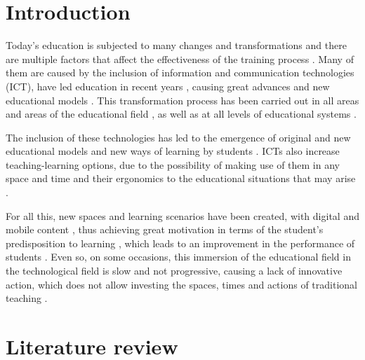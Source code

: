 \documentclass[english]{textolivre}
\begin{document}
\begin{polyabstract}
\begin{portuguese}
\begin{abstract}
\end{abstract}
\end{portuguese}

\end{polyabstract}


\section{Introduction}\label{sec-intro}
Today's education is subjected to many changes and transformations and there are multiple factors that affect the effectiveness of the training process \cite{murillo2016}. Many of them are caused by the inclusion of information and communication technologies (ICT), have led education in recent years \cite{rodriguez2018}, causing great advances and new educational models \cite{vinals2016}. This transformation process has been carried out in all areas and areas of the educational field \cite{area2016, pereira2019}, as well as at all levels of educational systems \cite{larionova2018}.

The inclusion of these technologies has led to the emergence of original and new educational models \cite{li2019} and new ways of learning by students \cite{garrote2018}. ICTs also increase teaching-learning options, due to the possibility of making use of them in any space and time and their ergonomics to the educational situations that may arise \cite{fombonapascual2017}.

For all this, new spaces and learning scenarios have been created, with digital and mobile content \cite{radu2014}, thus achieving great motivation in terms of the student's predisposition to learning \cite{villalustredelmoral2017}, which leads to an improvement in the performance of students \cite{marinmunoz2018}. Even so, on some occasions, this immersion of the educational field in the technological field is slow and not progressive, causing a lack of innovative action, which does not allow investing the spaces, times and actions of traditional teaching \cite{llanos2017}.

\section{Literature review}
\end{document}
